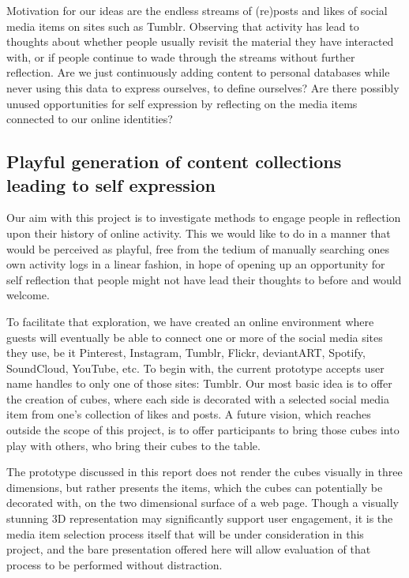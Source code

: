 \documentclass[conference]{IEEETran}
\begin{document}
Motivation for our ideas are the endless streams of (re)posts and likes of social media items on sites such as Tumblr\cite{1MinuteData,LM11}.  Observing that activity has lead to thoughts about whether people usually revisit the material they have interacted with, or if people continue to wade through the streams without further reflection.   Are we just continuously adding content to personal databases while never using this data to express ourselves, to define ourselves?  Are there possibly unused opportunities for self expression by reflecting on the media items connected to our online identities?



\subsection{Playful generation of content collections leading to self expression}

Our aim with this project is to investigate methods to engage people in reflection upon their history of online activity.  This we would like to do in a manner that would be perceived as playful, free from the tedium of manually searching ones own activity logs in a linear fashion, in hope of opening up an opportunity for self reflection that people might not have lead their thoughts to before and would welcome.

To facilitate that exploration, we have created an online environment where guests will eventually be able to connect one or more of the social media sites they use, be it Pinterest, Instagram, Tumblr, Flickr, deviantART, Spotify, SoundCloud, YouTube, etc.  To begin with, the current prototype accepts user name handles to only one of those sites:  Tumblr.  Our most basic idea is to offer the creation of cubes, where each side is decorated with a selected social media item from one's collection of likes and posts.  A future vision, which reaches outside the scope of this project, is to offer participants to bring those cubes into play with others, who bring their cubes to the table.

The prototype discussed in this report does not render the cubes visually in three dimensions, but rather presents the items, which the cubes can potentially be decorated with, on the two dimensional surface of a web page.  Though a visually stunning 3D representation may significantly support user engagement, it is the media item selection process itself that will be under consideration in this project, and the bare presentation offered here will allow evaluation of that process to be performed without distraction.
\end{document}
